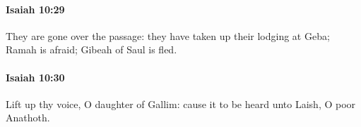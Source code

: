 		\paragraph{Isaiah 10:29} %
			\label{ISAIAH-10-29}

			They are gone over the passage: they have taken up their lodging at Geba; Ramah is afraid; Gibeah of Saul is fled.


		\paragraph{Isaiah 10:30} %
			\label{ISAIAH-10-30}

			Lift up thy voice, O daughter of Gallim: cause it to be heard unto Laish, O poor Anathoth.



